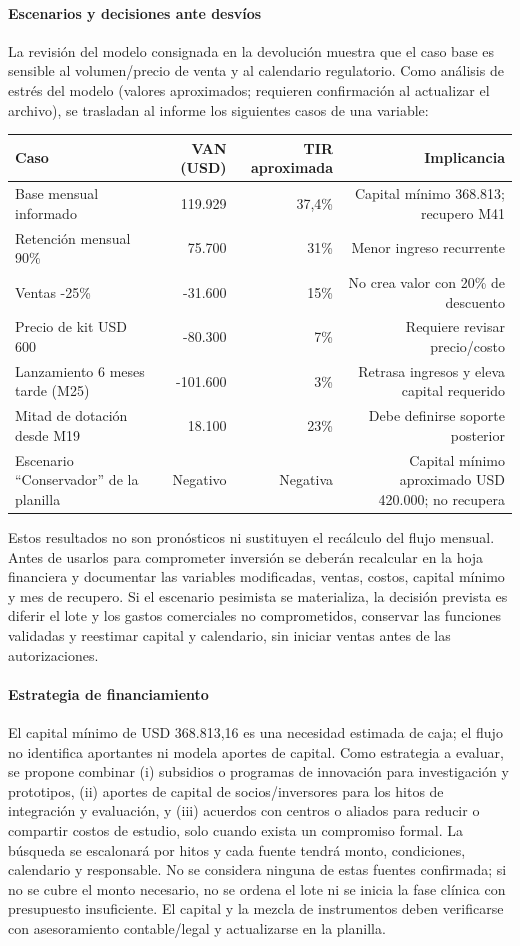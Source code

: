 \paragraph{Escenarios y decisiones ante desvíos}
La revisión del modelo consignada en la devolución muestra que el caso base es sensible al volumen/precio de venta y al calendario regulatorio. Como análisis de estrés del modelo (valores aproximados; requieren confirmación al actualizar el archivo), se trasladan al informe los siguientes casos de una variable:
\begin{center}\small
\begin{tabular}{lrrr}\toprule
Caso & VAN (USD) & TIR aproximada & Implicancia\\\midrule
Base mensual informado & 119.929 & 37,4\% & Capital mínimo 368.813; recupero M41\\
Retención mensual 90\% & 75.700 & 31\% & Menor ingreso recurrente\\
Ventas -25\% & -31.600 & 15\% & No crea valor con 20\% de descuento\\
Precio de kit USD 600 & -80.300 & 7\% & Requiere revisar precio/costo\\
Lanzamiento 6 meses tarde (M25) & -101.600 & 3\% & Retrasa ingresos y eleva capital requerido\\
Mitad de dotación desde M19 & 18.100 & 23\% & Debe definirse soporte posterior\\
Escenario ``Conservador'' de la planilla & Negativo & Negativa & Capital mínimo aproximado USD 420.000; no recupera\\
\bottomrule\end{tabular}\end{center}
Estos resultados no son pronósticos ni sustituyen el recálculo del flujo mensual. Antes de usarlos para comprometer inversión se deberán recalcular en la hoja financiera y documentar las variables modificadas, ventas, costos, capital mínimo y mes de recupero. Si el escenario pesimista se materializa, la decisión prevista es diferir el lote y los gastos comerciales no comprometidos, conservar las funciones validadas y reestimar capital y calendario, sin iniciar ventas antes de las autorizaciones.

\paragraph{Estrategia de financiamiento}
El capital mínimo de USD 368.813,16 es una necesidad estimada de caja; el flujo no identifica aportantes ni modela aportes de capital. Como estrategia a evaluar, se propone combinar (i) subsidios o programas de innovación para investigación y prototipos, (ii) aportes de capital de socios/inversores para los hitos de integración y evaluación, y (iii) acuerdos con centros o aliados para reducir o compartir costos de estudio, solo cuando exista un compromiso formal. La búsqueda se escalonará por hitos y cada fuente tendrá monto, condiciones, calendario y responsable. No se considera ninguna de estas fuentes confirmada; si no se cubre el monto necesario, no se ordena el lote ni se inicia la fase clínica con presupuesto insuficiente. El capital y la mezcla de instrumentos deben verificarse con asesoramiento contable/legal y actualizarse en la planilla.

